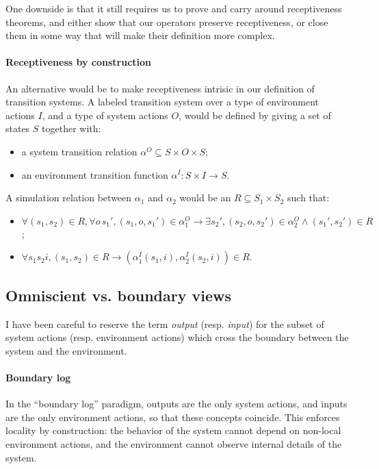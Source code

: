 \documentclass[11pt]{article}
\begin{document}
One downside is that it still requires us to prove and carry around
receptiveness theorems,
and either show that our operators preserve receptiveness,
or close them in some way that will make their definition more complex.

\paragraph{Receptiveness by construction}

An alternative would be to make receptiveness intrisic
in our definition of transition systems.
A labeled transition system over
a type of environment actions $I$, and
a type of system actions $O$,
would be defined by giving a set of states $S$ together with:
\begin{itemize}
\item a system transition relation $\alpha^O \subseteq S \times O \times S$;
\item an environment transition function $\alpha^I : S \times I \rightarrow S$.
\end{itemize}
A simulation relation between $\alpha_1$ and $\alpha_2$
would be an $R \subseteq S_1 \times S_2$ such that:
\begin{itemize}
\item $\forall (s_1, s_2) \in R,
  \forall o \, s_1', (s_1, o, s_1') \in \alpha_1^O \rightarrow
  \exists s_2', (s_2, o, s_2') \in \alpha_2^O \wedge (s_1', s_2') \in R$;
\item $\forall s_1 s_2 i, (s_1, s_2) \in R \rightarrow
  (\alpha^I_1(s_1, i), \alpha^I_2(s_2, i)) \in R$.
\end{itemize}



\subsection{Omniscient vs. boundary views} %

I have been careful to reserve the term \emph{output} (resp. \emph{input})
for the subset of system actions (resp. environment actions)
which cross the boundary between the system and the environment.

\paragraph{Boundary log}

In the ``boundary log'' paradigm,
outputs are the only system actions, and
inputs are the only environment actions,
so that these concepts coincide.
This enforces locality by construction:
the behavior of the system
cannot depend on non-local environment actions,
and the environment
cannot observe internal details of the system.
\end{document}
